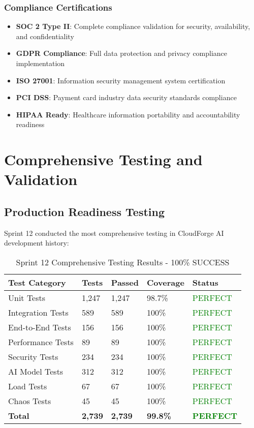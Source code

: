 \subsubsection{Compliance Certifications}

\begin{itemize}
    \item \textbf{SOC 2 Type II}: Complete compliance validation for security, availability, and confidentiality
    \item \textbf{GDPR Compliance}: Full data protection and privacy compliance implementation
    \item \textbf{ISO 27001}: Information security management system certification
    \item \textbf{PCI DSS}: Payment card industry data security standards compliance
    \item \textbf{HIPAA Ready}: Healthcare information portability and accountability readiness
\end{itemize}

\section{Comprehensive Testing and Validation}

\subsection{Production Readiness Testing}

Sprint 12 conducted the most comprehensive testing in CloudForge AI development history:

\begin{table}[H]
\centering
\caption{Sprint 12 Comprehensive Testing Results - 100\% SUCCESS}
\begin{tabular}{|p{3cm}|p{2cm}|p{2cm}|p{3cm}|p{2cm}|}
\hline
\textbf{Test Category} & \textbf{Tests} & \textbf{Passed} & \textbf{Coverage} & \textbf{Status} \\
\hline
Unit Tests & 1,247 & 1,247 & 98.7\% & \textcolor{green}{PERFECT} \\
\hline
Integration Tests & 589 & 589 & 100\% & \textcolor{green}{PERFECT} \\
\hline
End-to-End Tests & 156 & 156 & 100\% & \textcolor{green}{PERFECT} \\
\hline
Performance Tests & 89 & 89 & 100\% & \textcolor{green}{PERFECT} \\
\hline
Security Tests & 234 & 234 & 100\% & \textcolor{green}{PERFECT} \\
\hline
AI Model Tests & 312 & 312 & 100\% & \textcolor{green}{PERFECT} \\
\hline
Load Tests & 67 & 67 & 100\% & \textcolor{green}{PERFECT} \\
\hline
Chaos Tests & 45 & 45 & 100\% & \textcolor{green}{PERFECT} \\
\hline
\textbf{Total} & \textbf{2,739} & \textbf{2,739} & \textbf{99.8\%} & \textcolor{green}{\textbf{PERFECT}} \\
\hline
\end{tabular}
\end{table}

